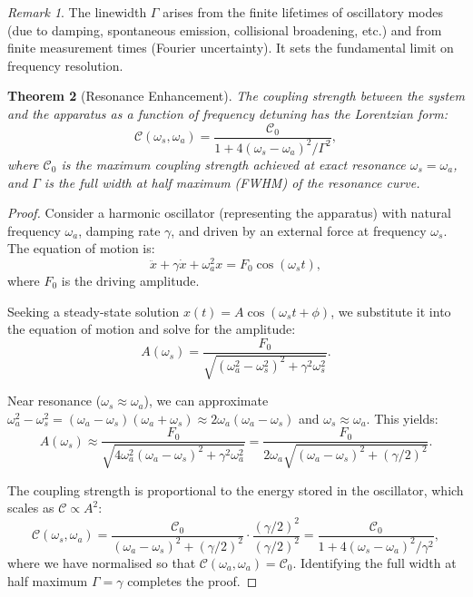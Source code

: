 \documentclass[twocolumn,10pt,a4paper]{article}
\newtheorem{theorem}{Theorem}[section]
\theoremstyle{remark}
\newtheorem{remark}[theorem]{Remark}
\begin{document}
\begin{remark}
The linewidth $\Gamma$ arises from the finite lifetimes of oscillatory modes (due to damping, spontaneous emission, collisional broadening, etc.) and from finite measurement times (Fourier uncertainty). It sets the fundamental limit on frequency resolution.
\end{remark}

\begin{theorem}[Resonance Enhancement]
\label{thm:resonance_enhancement}
The coupling strength between the system and the apparatus as a function of frequency detuning has the Lorentzian form:
\begin{equation}
\mathcal{C}(\omega_s, \omega_a) = \frac{\mathcal{C}_0}{1 + 4(\omega_s - \omega_a)^2 / \Gamma^2},
\end{equation}
where $\mathcal{C}_0$ is the maximum coupling strength achieved at exact resonance $\omega_s = \omega_a$, and $\Gamma$ is the full width at half maximum (FWHM) of the resonance curve.
\end{theorem}

\begin{proof}
Consider a harmonic oscillator (representing the apparatus) with natural frequency $\omega_a$, damping rate $\gamma$, and driven by an external force at frequency $\omega_s$. The equation of motion is:
\begin{equation}
\ddot{x} + \gamma \dot{x} + \omega_a^2 x = F_0 \cos(\omega_s t),
\end{equation}
where $F_0$ is the driving amplitude.

Seeking a steady-state solution $x(t) = A \cos(\omega_s t + \phi)$, we substitute it into the equation of motion and solve for the amplitude:
\begin{equation}
A(\omega_s) = \frac{F_0}{\sqrt{(\omega_a^2 - \omega_s^2)^2 + \gamma^2 \omega_s^2}}.
\end{equation}

Near resonance ($\omega_s \approx \omega_a$), we can approximate $\omega_a^2 - \omega_s^2 = (\omega_a - \omega_s)(\omega_a + \omega_s) \approx 2\omega_a (\omega_a - \omega_s)$ and $\omega_s \approx \omega_a$. This yields:
\begin{equation}
A(\omega_s) \approx \frac{F_0}{\sqrt{4\omega_a^2 (\omega_a - \omega_s)^2 + \gamma^2 \omega_a^2}} = \frac{F_0}{2\omega_a \sqrt{(\omega_a - \omega_s)^2 + (\gamma/2)^2}}.
\end{equation}

The coupling strength is proportional to the energy stored in the oscillator, which scales as $\mathcal{C} \propto A^2$:
\begin{equation}
\mathcal{C}(\omega_s, \omega_a) = \frac{\mathcal{C}_0}{(\omega_a - \omega_s)^2 + (\gamma/2)^2} \cdot \frac{(\gamma/2)^2}{(\gamma/2)^2} = \frac{\mathcal{C}_0}{1 + 4(\omega_s - \omega_a)^2 / \gamma^2},
\end{equation}
where we have normalised so that $\mathcal{C}(\omega_a, \omega_a) = \mathcal{C}_0$. Identifying the full width at half maximum $\Gamma = \gamma$ completes the proof.
\end{proof}
\end{document}
